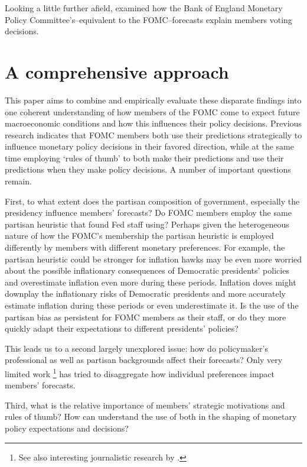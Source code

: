 \documentclass[a4paper]{article}\usepackage[]{graphicx}\usepackage[]{color}
\begin{document}
Looking a little further afield, \cite{Besley2008} examined how the Bank of England Monetary Policy Committee's--equivalent to the FOMC--forecasts explain members voting decisions. 

\section{A comprehensive approach} 

This paper aims to combine and empirically evaluate these disparate findings into one coherent understanding of how members of the FOMC come to expect future macroeconomic conditions and how this influences their policy decisions. Previous research indicates that FOMC members both use their predictions strategically to influence monetary policy decisions in their favored direction, while at the same time employing `rules of thumb' to both make their predictions and use their predictions when they make policy decisions. A number of important questions remain. 

First, to what extent does the partisan composition of government, especially the presidency influence members' forecasts? Do FOMC members employ the same partisan heuristic that \cite{gandrud2013does} found Fed staff using? Perhaps given the heterogeneous nature of how the FOMC's membership the partisan heuristic is employed differently by members with different monetary preferences. For example, the partisan heuristic could be stronger for inflation hawks may be even more worried about the possible inflationary consequences of Democratic presidents' policies and overestimate inflation even more during these periods. Inflation doves might downplay the inflationary risks of Democratic presidents and more accurately estimate inflation during these periods or even underestimate it. Is the use of the partisan bias as persistent for FOMC members as their staff, or do they more quickly adapt their expectations to different presidents' policies?

This leads us to a second largely unexplored issue: how do policymaker's professional as well as partisan backgrounds affect their forecasts? Only very limited work \citep[see][]{Tillmann2011}\footnote{See also interesting journalistic research by \cite{Hilsenrath2013}.} has tried to disaggregate how individual preferences impact members' forecasts.

Third, what is the relative importance of members' strategic motivations and rules of thumb? How can understand the use of both in the shaping of monetary policy expectations and decisions?  
\end{document}
